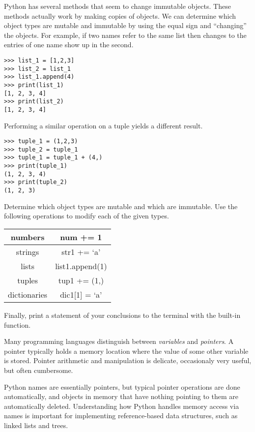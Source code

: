 \begin{problem}
Python has several methods that seem to change immutable objects.
These methods actually work by making copies of objects.
We can determine which object types are mutable and immutable by using the equal sign and ``changing'' the objects.
For example, if two names refer to the same list then changes to the entries of one name show up in the second.

\begin{lstlisting}
>>> list_1 = [1,2,3]
>>> list_2 = list_1
>>> list_1.append(4)
>>> print(list_1)
[1, 2, 3, 4]
>>> print(list_2)
[1, 2, 3, 4]
\end{lstlisting}

Performing a similar operation on a tuple yields a different result.
\begin{lstlisting}
>>> tuple_1 = (1,2,3)
>>> tuple_2 = tuple_1
>>> tuple_1 = tuple_1 + (4,)
>>> print(tuple_1)
(1, 2, 3, 4)
>>> print(tuple_2)
(1, 2, 3)
\end{lstlisting}

Determine which object types are mutable and which are immutable.
Use the following operations to modify each of the given types.
\begin{center}
\begin{tabular}{|c|c|}
\hline
numbers & num += 1 \\
\hline
strings & str1 += `a' \\
\hline
lists & list1.append(1) \\
\hline
tuples & tup1 += (1,) \\
\hline
dictionaries & dic1[1] = `a' \\
\hline
\end{tabular}
\end{center}

Finally, print a statement of your conclusions to the terminal with the built-in  function.
\end{problem}

\begin{info}
Many programming languages distinguish between \emph{variables} and \emph{pointers}.
A pointer typically holds a memory location where the value of some other variable is stored.
Pointer arithmetic and manipulation is delicate, occasionaly very useful, but often cumbersome.

Python names are essentially pointers, but typical pointer operations are done automatically, and objects in memory that have nothing pointing to them are automatically deleted.
Understanding how Python handles memory access via names is important for implementing reference-based data structures, such as linked lists and trees.
\end{info}

